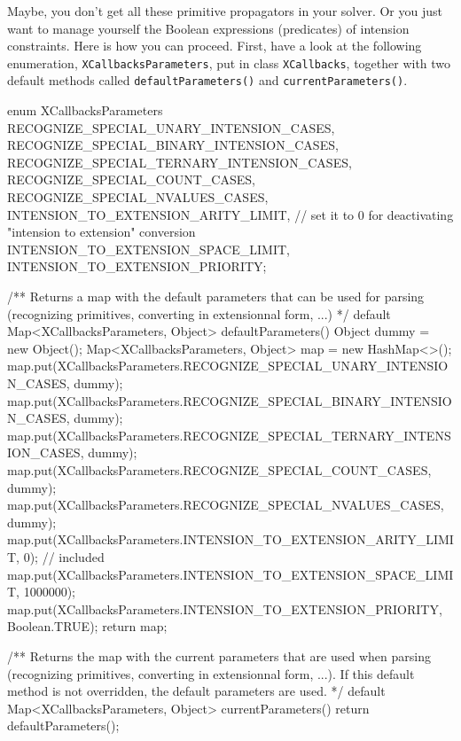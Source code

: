 \documentclass[10pt]{article}
\newenvironment{boxabsc}
               {\medskip \begin{bclogo}[barre=none,arrondi=0.2,logo=]{}\vspace{-0.6cm}}
               {\vspace{-0.1cm}\end{bclogo} \smallskip}
\newcommand{\nn}[1]{{\tt #1}} %
\begin{document}
Maybe, you don't get all these primitive propagators in your solver.
Or you just want to manage yourself the Boolean expressions (predicates) of intension constraints.
Here is how you can proceed.
First, have a look at the following enumeration, \nn{XCallbacksParameters}, put in class \nn{XCallbacks}, together with two default methods called \nn{defaultParameters()} and \nn{currentParameters()}.

\begin{boxabsc}
\begin{absc}
enum XCallbacksParameters {
  RECOGNIZE_SPECIAL_UNARY_INTENSION_CASES,
  RECOGNIZE_SPECIAL_BINARY_INTENSION_CASES,
  RECOGNIZE_SPECIAL_TERNARY_INTENSION_CASES,
  RECOGNIZE_SPECIAL_COUNT_CASES,
  RECOGNIZE_SPECIAL_NVALUES_CASES,
  INTENSION_TO_EXTENSION_ARITY_LIMIT, // set it to 0 for deactivating "intension to extension" conversion
  INTENSION_TO_EXTENSION_SPACE_LIMIT,
  INTENSION_TO_EXTENSION_PRIORITY;
}

/** Returns a map with the default parameters that can be used for parsing (recognizing primitives, converting in extensionnal form, ...) */
default Map<XCallbacksParameters, Object> defaultParameters() {
  Object dummy = new Object();
  Map<XCallbacksParameters, Object> map = new HashMap<>();
  map.put(XCallbacksParameters.RECOGNIZE_SPECIAL_UNARY_INTENSION_CASES, dummy);
  map.put(XCallbacksParameters.RECOGNIZE_SPECIAL_BINARY_INTENSION_CASES, dummy);
  map.put(XCallbacksParameters.RECOGNIZE_SPECIAL_TERNARY_INTENSION_CASES, dummy);
  map.put(XCallbacksParameters.RECOGNIZE_SPECIAL_COUNT_CASES, dummy);
  map.put(XCallbacksParameters.RECOGNIZE_SPECIAL_NVALUES_CASES, dummy);
  map.put(XCallbacksParameters.INTENSION_TO_EXTENSION_ARITY_LIMIT, 0); // included
  map.put(XCallbacksParameters.INTENSION_TO_EXTENSION_SPACE_LIMIT, 1000000);
  map.put(XCallbacksParameters.INTENSION_TO_EXTENSION_PRIORITY, Boolean.TRUE);
  return map;
}

/** Returns the map with the current parameters that are used when parsing (recognizing primitives, converting in extensionnal form, ...). If this default method
 is not overridden, the default parameters are used. */
default Map<XCallbacksParameters, Object> currentParameters() {
  return defaultParameters();
}
\end{absc} 
\end{boxabsc}
\end{document}
